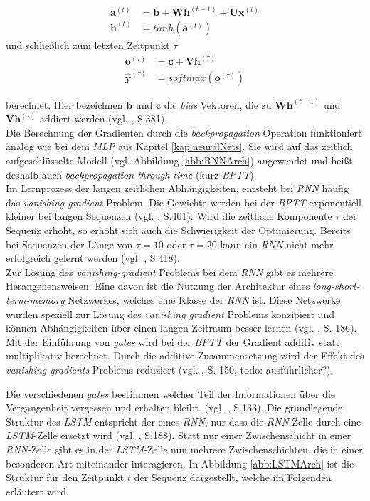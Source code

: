 \documentclass[a4paper,11pt]{article}
\begin{document}
\begin{align*}
    \bm{a}^{(t)} &= \bm{b} + \bm{W} \bm{h}^{(t-1)} + \bm{U}\bm{x}^{(t)} \\
    \bm{h}^{(t)} &= tanh(\bm{a}^{(t)}) 
\end{align*}
    und schließlich zum letzten Zeitpunkt $\tau$
\begin{align*}
    \bm{o}^{(\tau)} &= \bm{c} + \bm{V}\bm{h}^{(\tau)} \\
    \bm{\hat{y}}^{(\tau)} &= softmax(\bm{o}^{(\tau)})
\end{align*}

berechnet. Hier bezeichnen $\bm{b}$ und $\bm{c}$ die \textit{bias} Vektoren, die zu $\bm{W} \bm{h}^{(t-1)} $ und $\bm{V}\bm{h}^{(\tau)} $ addiert werden (vgl. \cite{deepL}, S.381).\\ 
Die Berechnung der Gradienten durch die \textit{backpropagation} Operation funktioniert analog wie bei dem \textit{MLP} aus Kapitel \ref{kap:neuralNets}. Sie wird auf das zeitlich aufgeschlüsselte Modell (vgl. Abbildung \ref{abb:RNNArch}) angewendet und heißt deshalb auch \textit{backpropagation-through-time} (kurz \textit{BPTT}). \\
Im Lernprozess der langen zeitlichen Abhängigkeiten, entsteht bei \textit{RNN} häufig das \textit{vanishing-gradient} Problem.
Die Gewichte werden bei der \textit{BPTT} exponentiell kleiner bei langen Sequenzen (vgl. \cite{deepL}, S.401). Wird die zeitliche Komponente $\tau$ der Sequenz erhöht, so erhöht sich auch die Schwierigkeit der Optimierung.
Bereits bei Sequenzen der Länge von $\tau = 10$ oder $\tau = 20$ kann ein \textit{RNN} nicht mehr erfolgreich gelernt werden (vgl. \cite{deepL}, S.418).\\

Zur Lösung des \textit{vanishing-gradient} Problems bei dem \textit{RNN} gibt es mehrere Herangehensweisen. Eine davon ist die Nutzung der Architektur eines \textit{long-short-term-memory} Netzwerkes, welches eine Klasse der \textit{RNN} ist. Diese Netzwerke wurden speziell zur Lösung des \textit{vanishing gradient} Problems konzipiert und können Abhängigkeiten über einen langen Zeitraum besser lernen (vgl. \cite{keras}, S. 186). Mit der Einführung von \textit{gates} wird bei der \textit{BPTT} der Gradient additiv statt multiplikativ berechnet. Durch die additive Zusammensetzung wird der Effekt des \textit{vanishing gradients} Problems reduziert (vgl. \cite{deepEssentials}, S. 150, todo: ausführlicher?).

Die verschiedenen \textit{gates} bestimmen welcher Teil der Informationen über die Vergangenheit vergessen und erhalten bleibt. (vgl. \cite{deepNLP}, S.133). Die grundlegende Struktur des \textit{LSTM} entspricht der eines \textit{RNN}, nur dass die \textit{RNN}-Zelle durch eine \textit{LSTM}-Zelle ersetzt wird (vgl. \cite{keras}, S.188). Statt nur einer Zwischenschicht in einer \textit{RNN}-Zelle gibt es in der \textit{LSTM}-Zelle nun mehrere Zwischenschichten, die in einer besonderen Art miteinander interagieren. In Abbildung \ref{abb:LSTMArch} ist die Struktur für den Zeitpunkt $t$ der Sequenz dargestellt, welche im Folgenden erläutert wird.
\end{document}
